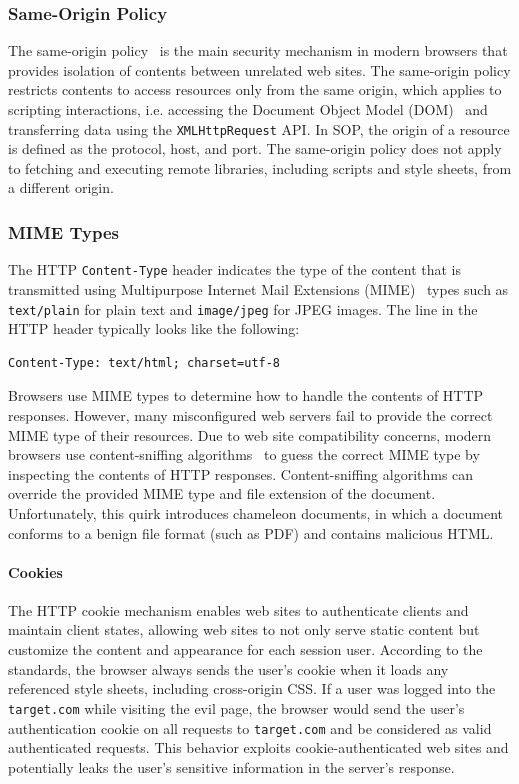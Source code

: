 \documentclass{acm_proc_article-sp}
\begin{document}
\subsubsection{Same-Origin Policy}
The same-origin policy~\cite{mozillasameorigin} is the main security mechanism in modern browsers that provides isolation of contents between unrelated web sites. The same-origin policy restricts contents to access resources only from the same origin, which applies to scripting interactions, i.e. accessing the Document Object Model (DOM)~\cite{dom} and transferring data using the \texttt{XMLHttpRequest} API. In SOP, the origin of a resource is defined as the protocol, host, and port. The same-origin policy does not apply to fetching and executing remote libraries, including scripts and style sheets, from a different origin.

\subsubsection{MIME Types}
The HTTP \texttt{Content-Type} header indicates the type of the content that is transmitted using Multipurpose Internet Mail Extensions (MIME)~\cite{mime} types such as \texttt{text/plain} for plain text and \texttt{image/jpeg} for JPEG images. The line in the HTTP header typically looks like the following:
\begin{verbatim}
Content-Type: text/html; charset=utf-8
\end{verbatim}
Browsers use MIME types to determine how to handle the contents of HTTP responses. However, many misconfigured web servers fail to provide the correct MIME type of their resources. Due to web site compatibility concerns, modern browsers use content-sniffing algorithms~\cite{securecontentsniffing} to guess the correct MIME type by inspecting the contents of HTTP responses.  Content-sniffing algorithms can override the provided MIME type and file extension of the document. Unfortunately, this quirk introduces chameleon documents, in which a document conforms to a benign file format (such as PDF) and contains malicious HTML.

\paragraph{Cookies}
The HTTP cookie mechanism enables web sites to authenticate clients and maintain client states, allowing web sites to not only serve static content but customize the content and appearance for each session user. According to the standards, the browser always sends the user's cookie when it loads any referenced style sheets, including cross-origin CSS. If a user was logged into the \texttt{target.com} while visiting the evil page, the browser would send the user's authentication cookie on all requests to \texttt{target.com} and be considered as valid authenticated requests. This behavior exploits cookie-authenticated web sites and potentially leaks the user's sensitive information in the server's response.
\end{document}
